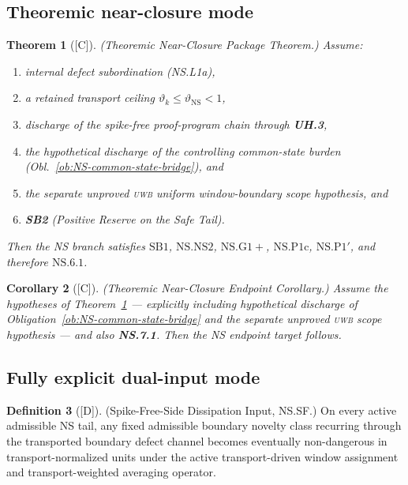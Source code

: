 \documentclass[12pt,oneside]{amsbook}
\theoremstyle{plain}
\newtheorem{theorem}{Theorem}[section]
\newtheorem{corollary}[theorem]{Corollary}
\theoremstyle{definition}
\newtheorem{definition}[theorem]{Definition}
\theoremstyle{remark}
\newcommand{\status}[1]{\textup{[#1]}}
\begin{document}
\subsection{Theoremic near-closure mode}

\begin{theorem}[\status{C}]\label{thm:NSTN2}
\textup{(Theoremic Near-Closure Package Theorem.)}
Assume:
\begin{enumerate}[label=\textup{(\arabic*)}]
 \item internal defect subordination (NS.L1a),
 \item a retained transport ceiling $\vartheta_k \le \vartheta_{\mathrm{NS}} < 1$,
 \item discharge of the spike-free proof-program chain through \textbf{UH.3},
 \item the hypothetical discharge of the controlling common-state burden (Obl.~\ref{ob:NS-common-state-bridge}), and
 \item the separate unproved \textsc{uwb} uniform window-boundary
 scope hypothesis, and
 \item \textbf{SB2} (Positive Reserve on the Safe Tail).
\end{enumerate}
Then the NS branch satisfies $\mathrm{SB1}$, $\mathrm{NS.NS2}$, $\mathrm{NS.G1+}$, $\mathrm{NS.P1c}$, $\mathrm{NS.P1'}$, and therefore $\mathrm{NS.6.1}$.
\end{theorem}

\begin{corollary}[\status{C}]\label{cor:NSTN3}
\textup{(Theoremic Near-Closure Endpoint Corollary.)}
Assume the hypotheses of Theorem~\ref{thm:NSTN2} --- explicitly
including hypothetical discharge of
Obligation~\ref{ob:NS-common-state-bridge} and the separate unproved
\textsc{uwb} scope hypothesis --- and also \textbf{NS.7.1}. Then the
NS endpoint target follows.
\end{corollary}

\subsection{Fully explicit dual-input mode}

\begin{definition}[\status{D}]\label{def:NSSF}
\textup{(Spike-Free-Side Dissipation Input, NS.SF.)}
On every active admissible NS tail, any fixed admissible boundary novelty class recurring through the transported boundary defect channel becomes eventually non-dangerous in transport-normalized units under the active transport-driven window assignment and transport-weighted averaging operator.
\end{definition}
\end{document}
